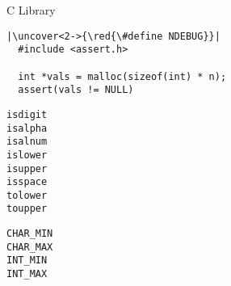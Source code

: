\begin{frame}{}
  \centerline{\LARGE C Library}
\end{frame}

\begin{frame}{}
\end{frame}

\begin{frame}{}
\end{frame}

\begin{frame}[fragile]{}
  \centerline{\large {}}

  \vspace{0.50cm}
  \begin{lstlisting}[style = Cstyle]
  |\uncover<2->{\red{\#define NDEBUG}}|
  #include <assert.h>

  int *vals = malloc(sizeof(int) * n);
  assert(vals != NULL)
  \end{lstlisting}
\end{frame}

\begin{frame}{}
  \centerline{\large {}}

  \begin{center}
    {\large
    \texttt{isdigit}\\[0.10cm]
    \texttt{isalpha}\\[0.10cm]
    \texttt{isalnum}\\[0.40cm]

    \texttt{islower}\\[0.10cm]
    \texttt{isupper}\\[0.40cm]

    \texttt{isspace}\\[0.40cm]

    \texttt{tolower}\\[0.10cm]
    \texttt{toupper}
    }
  \end{center}
\end{frame}

\begin{frame}{}
  \centerline{\large {}}

  \begin{center}
    {\large
    \texttt{CHAR\_MIN}\\[0.10cm]
    \texttt{CHAR\_MAX}\\[0.40cm]

    \texttt{INT\_MIN}\\[0.10cm]
    \texttt{INT\_MAX}
    }
  \end{center}
\end{frame}

